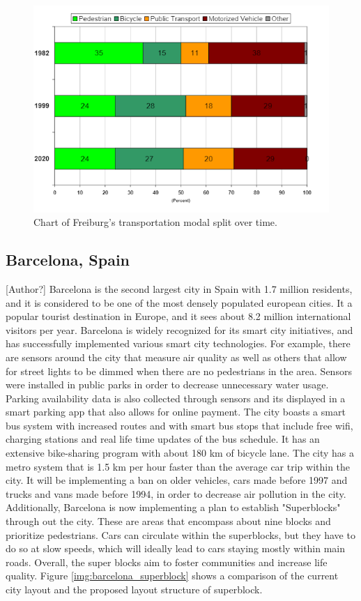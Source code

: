 \documentclass[12pt]{article}                         %
\begin{document}
\begin{figure}[h]
    \centering
    \includegraphics[scale=0.75]{freiburg_modal_split.png}
    \caption{Chart of Freiburg's transportation modal split over time.}
    \label{img:freiburg_modal_split}
\end{figure}

\subsection{Barcelona, Spain}[Author?]
Barcelona is the second largest city in Spain with 1.7 million residents, and it is considered to be one of the most densely populated european cities. It a popular tourist destination in Europe, and it sees about 8.2 million international visitors per year. Barcelona is widely recognized for its smart city initiatives, and has successfully implemented various smart city technologies. For example, there are sensors around the city that measure air quality as well as others that allow for street lights to be dimmed when there are no pedestrians in the area. Sensors were installed in public parks in order to decrease unnecessary water usage. Parking availability data is also collected through sensors and its displayed in a smart parking app that also allows for online payment. The city boasts a smart bus system with increased routes and with smart bus stops that include free wifi, charging stations and real life time updates of the bus schedule. It has an extensive bike-sharing program with about 180 km of bicycle lane. The city has a metro system that is 1.5 km per hour faster than the average car trip within the city. It will be implementing a ban on older vehicles, cars made before 1997 and trucks and vans made before 1994, in order to decrease air pollution in the city. Additionally, Barcelona is now implementing a plan to establish "Superblocks" through out the city. These are areas that encompass about nine blocks and prioritize pedestrians. Cars can circulate within the superblocks, but they have to do so at slow speeds, which will ideally lead to cars staying mostly within main roads. Overall, the super blocks aim to foster communities and increase life quality. Figure \ref{img:barcelona_superblock} shows a comparison of the current city layout and the proposed layout structure of superblock.
\end{document}
